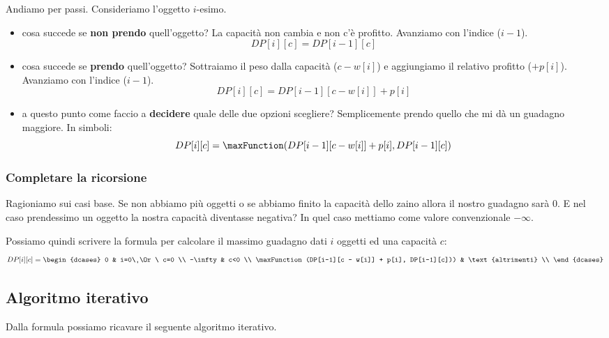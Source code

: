 Andiamo per passi.
Consideriamo l'oggetto \(i\)-esimo.
\begin{itemize}
    \item cosa succede se \textbf{non prendo} quell'oggetto?
    La capacità non cambia e non c'è profitto.
    Avanziamo con l'indice (\(i-1\)).
    \[DP[i][c] = DP[i-1][c]\]

    \item cosa succede se \textbf{prendo} quell'oggetto?
    Sottraiamo il peso dalla capacità (\(c - w[i]\)) e aggiungiamo il relativo profitto (\(+ p[i]\)).
    Avanziamo con l'indice (\(i-1\)).
    \[DP[i][c] = DP[i-1][c - w[i]] + p[i]\]

    \item a questo punto come faccio a \textbf{decidere} quale delle due opzioni scegliere?
    Semplicemente prendo quello che mi dà un guadagno maggiore.
    In simboli:
    \[DP[i][c] = \maxFunction(DP[i-1][c - w[i]] + p[i], DP[i-1][c])\]
\end{itemize}

\subsubsection{Completare la ricorsione}

Ragioniamo sui casi base.
Se non abbiamo più oggetti o se abbiamo finito la capacità dello zaino allora il nostro guadagno sarà \(0\).
E nel caso prendessimo un oggetto la nostra capacità diventasse negativa?
In quel caso mettiamo come valore convenzionale \(-\infty\).

Possiamo quindi scrivere la formula per calcolare il massimo guadagno dati \(i\) oggetti ed una capacità \(c\):
\[
    DP[i][c] =
    \begin{dcases}
        0                                                   & i=0\ \Or\ c=0     \\
        -\infty                                             & c<0               \\
        \maxFunction(DP[i-1][c - w[i]] + p[i], DP[i-1][c])) & \text{altrimenti} \\
    \end{dcases}
\]

\subsection{Algoritmo iterativo}

Dalla formula possiamo ricavare il seguente algoritmo iterativo.

